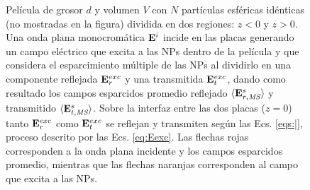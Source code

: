 \begin{figure}[h!]
\begin{tikzpicture}[scale=1]
\end{tikzpicture}
	\caption{ Película de grosor $d$ y volumen $V$ con $N$ partículas esféricas idénticas (no mostradas en la figura) dividida en dos regiones: $z<0$ y $z>0$. Una onda plana monocromática $\vb{E}^i$ incide en las placas  generando un campo eléctrico que excita a las NPs dentro de la película y que considera el esparcimiento múltiple de las NPs al dividirlo en una componente reflejada $\vb{E}^{exc}_r$ y una transmitida $\vb{E}^{exc}_t$, dando como resultado los campos esparcidos promedio reflejado $\langle\vb{E}_{r,\textit{MS}}^s\rangle$ y transmitido $\langle\vb{E}_{t,\textit{MS}}^s\rangle$. Sobre la interfaz entre las dos placas ($z=0$) tanto $\vb{E}^{exc}_r$ como $\vb{E}^{exc}_t$ se reflejan y transmiten según las Ecs. \eqref{eqs:|}, proceso descrito por las Ecs. \eqref{eq:Eexc}. Las flechas rojas corresponden a la onda plana incidente y los campos esparcidos promedio, mientras que las flechas naranjas corresponden al campo que excita a las NPs. }\label{fig:Eexc}
	\end{figure}	
	

